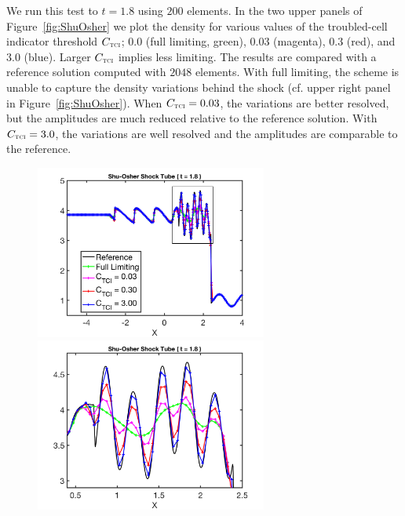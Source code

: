 \documentclass[letterpaper]{jpconf}
\newcommand{\TCI}{\textnormal{\tiny\textsc{TCI}}}
\begin{document}
We run this test to $t=1.8$ using $200$ elements.  
In the two upper panels of Figure~\ref{fig:ShuOsher} we plot the density for various values of the troubled-cell indicator threshold $C_{\TCI}$; $0.0$ (full limiting, green), $0.03$ (magenta), $0.3$ (red), and $3.0$ (blue).  
Larger $C_{\TCI}$ implies less limiting.  
The results are compared with a reference solution computed with $2048$ elements.  
With full limiting, the scheme is unable to capture the density variations behind the shock (cf. upper right panel in Figure~\ref{fig:ShuOsher}).  
When $C_{\TCI}=0.03$, the variations are better resolved, but the amplitudes are much reduced relative to the reference solution.  
With $C_{\TCI}=3.0$, the variations are well resolved and the amplitudes are comparable to the reference.  
\begin{figure}[h]
  \centering
  \begin{minipage}{18pc}
    \includegraphics[width=18pc]{./Figures/ShuOsher_Astronum_2018}
  \end{minipage}\hspace{0.5pc}%
  \begin{minipage}{18pc}
    \includegraphics[width=18pc]{./Figures/ShuOsher_Inset_Astronum_2018}

\end{minipage}
\end{figure}
\end{document}
